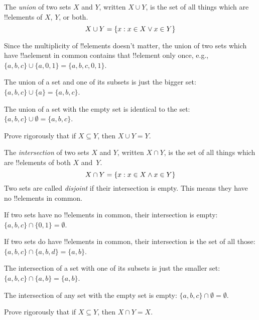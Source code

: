 \documentclass[../../../include/open-logic-section]{subfiles}
\begin{document}

\begin{defn}[Union]
The \emph{union} of two sets $X$ and $Y$, written $X \cup Y$, is the
set of all things which are !!{element}s of $X$, $Y$, or both.
\[
X \cup Y = \{ x : x \in X \lor x\in Y \}
\]
\end{defn}

\begin{ex}
Since the multiplicity of !!{element}s doesn't matter, the union of two
sets which have !!a{element} in common contains that !!{element} only once,
e.g., $\{ a, b, c\} \cup \{ a, 0, 1\} = \{a, b, c, 0, 1\}$.

The union of a set and one of its subsets is just the bigger set: $\{a,
b, c \} \cup \{a \} = \{a, b, c\}$.

The union of a set with the empty set is identical to the set: $\{a,
b, c \} \cup \emptyset = \{a, b, c \}$.
\end{ex}

\begin{prob}
Prove rigorously that if $X \subseteq Y$, then $X \cup Y = Y$.
\end{prob}

\begin{defn}[Intersection]
The \emph{intersection} of two sets $X$ and $Y$, written $X \cap Y$, is
the set of all things which are !!{element}s of both $X$ and~$Y$.
\[
X \cap Y = \{ x : x \in X \land x\in Y \}
\]
Two sets are called \emph{disjoint} if their intersection is
empty. This means they have no !!{element}s in common.
\end{defn}

\begin{ex}
If two sets have no !!{element}s in common, their intersection is empty:
$\{ a, b, c\} \cap \{ 0, 1\} = \emptyset$.

If two sets do have !!{element}s in common, their intersection is the set of
all those: $\{a, b, c \} \cap \{a, b, d \} = \{a, b\}$.

The intersection of a set with one of its subsets is just the smaller
set: $\{a, b, c\} \cap \{a, b\} = \{a, b\}$.

The intersection of any set with the empty set is empty: $\{a, b, c \}
\cap \emptyset = \emptyset$.
\end{ex}

\begin{prob}
Prove rigorously that if $X \subseteq Y$, then $X \cap Y = X$.
\end{prob}
\end{document}
